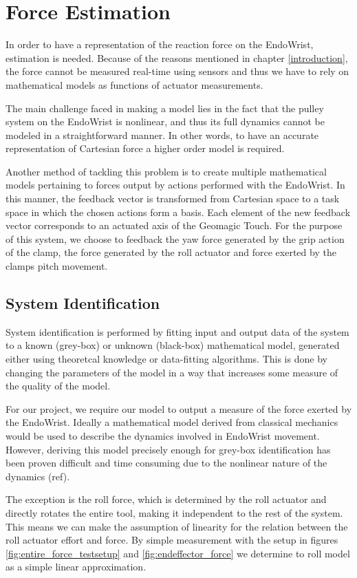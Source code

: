 \chapter{Force Estimation}
In order to have a representation of the reaction force on the EndoWrist, estimation is needed.
Because of the reasons mentioned in chapter \ref{introduction}, the force cannot be measured real-time using sensors and thus we have to rely on mathematical models as functions of actuator measurements.

The main challenge faced in making a model lies in the fact that the pulley system on the EndoWrist is nonlinear, and thus its full dynamics cannot be modeled in a straightforward manner. 
In other words, to have an accurate representation of Cartesian force a higher order model is required.

Another method of tackling this problem is to create multiple mathematical models pertaining to forces output by actions performed with the EndoWrist.
In this manner, the feedback vector is transformed from Cartesian space to a task space in which the chosen actions form a basis.
Each element of the new feedback vector corresponds to an actuated axis of the Geomagic Touch.
For the purpose of this system, we choose to feedback the yaw force generated by the grip action of the clamp, the force generated by the roll actuator and force exerted by the clamps pitch movement.

\section{System Identification}
System identification is performed by fitting input and output data of the system to a known (grey-box) or unknown (black-box) mathematical model, generated either using theoretcal knowledge or data-fitting algorithms. 
This is done by changing the parameters of the model in a way that increases some measure of the quality of the model.

For our project, we require our model to output a measure of the force exerted by the EndoWrist.
Ideally a mathematical model derived from classical mechanics would be used to describe the dynamics involved in EndoWrist movement.
However, deriving this model precisely enough for grey-box identification has been proven difficult and time consuming due to the nonlinear nature of the dynamics (ref).

The exception is the roll force, which is determined by the roll actuator and directly rotates the entire tool, making it independent to the rest of the system.
This means we can make the assumption of linearity for the relation between the roll actuator effort and force.  
By simple measurement with the setup in figures \ref{fig:entire_force_testsetup} and \ref{fig:endeffector_force} we determine to roll model as a simple
linear approximation.

